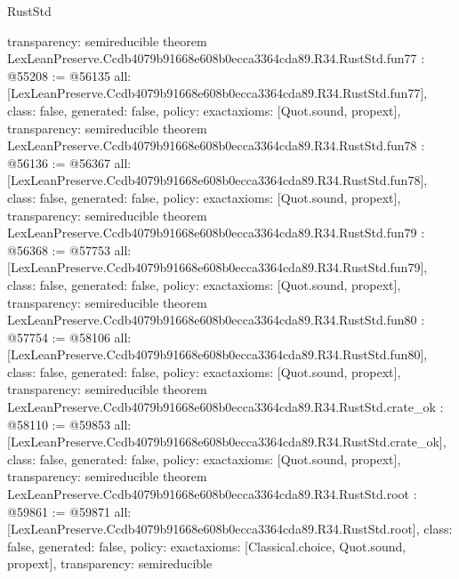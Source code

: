 \begin{lexlean}{RustStd}
\begin{coremodule}
{  transparency: semireducible
}
theorem LexLeanPreserve.Ccdb4079b91668e608b0ecca3364cda89.R34.RustStd.fun77 : @55208 := @56135 {
  all: [LexLeanPreserve.Ccdb4079b91668e608b0ecca3364cda89.R34.RustStd.fun77],
  class: false,
  generated: false,
  policy: exact{axioms: [Quot.sound, propext]},
  transparency: semireducible
}
theorem LexLeanPreserve.Ccdb4079b91668e608b0ecca3364cda89.R34.RustStd.fun78 : @56136 := @56367 {
  all: [LexLeanPreserve.Ccdb4079b91668e608b0ecca3364cda89.R34.RustStd.fun78],
  class: false,
  generated: false,
  policy: exact{axioms: [Quot.sound, propext]},
  transparency: semireducible
}
theorem LexLeanPreserve.Ccdb4079b91668e608b0ecca3364cda89.R34.RustStd.fun79 : @56368 := @57753 {
  all: [LexLeanPreserve.Ccdb4079b91668e608b0ecca3364cda89.R34.RustStd.fun79],
  class: false,
  generated: false,
  policy: exact{axioms: [Quot.sound, propext]},
  transparency: semireducible
}
theorem LexLeanPreserve.Ccdb4079b91668e608b0ecca3364cda89.R34.RustStd.fun80 : @57754 := @58106 {
  all: [LexLeanPreserve.Ccdb4079b91668e608b0ecca3364cda89.R34.RustStd.fun80],
  class: false,
  generated: false,
  policy: exact{axioms: [Quot.sound, propext]},
  transparency: semireducible
}
theorem LexLeanPreserve.Ccdb4079b91668e608b0ecca3364cda89.R34.RustStd.crate_ok : @58110 := @59853 {
  all: [LexLeanPreserve.Ccdb4079b91668e608b0ecca3364cda89.R34.RustStd.crate_ok],
  class: false,
  generated: false,
  policy: exact{axioms: [Quot.sound, propext]},
  transparency: semireducible
}
theorem LexLeanPreserve.Ccdb4079b91668e608b0ecca3364cda89.R34.RustStd.root : @59861 := @59871 {
  all: [LexLeanPreserve.Ccdb4079b91668e608b0ecca3364cda89.R34.RustStd.root],
  class: false,
  generated: false,
  policy: exact{axioms: [Classical.choice, Quot.sound, propext]},
  transparency: semireducible
}


\end{coremodule}
\end{lexlean}
